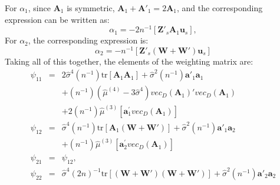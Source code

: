 \documentclass{article}
\begin{document}
For $\alpha_1$, since $\mathbf{A}_1$ is symmetric, $\mathbf{A}_1 + \mathbf{A'}_1 = 2 \mathbf{A}_1$, and the corresponding expression can be written as:
\begin{equation*}
\alpha_1 = - 2 n^{-1} [ \mathbf{Z'}_s \mathbf{A}_1 \mathbf{u}_s ],
\end{equation*}
 For $\alpha_2$, the corresponding expression is:
\begin{equation*}
 \alpha_2 = - n^{-1} [ \mathbf{Z'}_s (\mathbf{W} + \mathbf{W'} ) \mathbf{u}_s ]
\end{equation*}
Taking all of this together, the elements of the weighting matrix are:
\begin{eqnarray*}
 \psi_{11} &=& 2  \hat{\sigma}^4 (n^{-1}) \mbox{tr} [ \mathbf{A}_1\mathbf{A}_1 ]
              + \hat{\sigma}^2 (n^{-1}) \mathbf{a'}_1 \mathbf{a}_1 \\
            &&+ (n^{-1}) (\hat{\mu}^{(4)} - 3 \hat{\sigma}^4) vec_D(\mathbf{A}_1)'vec_D (\mathbf{A}_1) \\
            &&+ 2 (n^{-1}) \hat{\mu}^{(3)} [ \mathbf{a}_1^{'} vec_D(\mathbf{A}_1)] \\
  \psi_{12} &=& \hat{\sigma}^4 (n^{-1}) \mbox{tr} [  \mathbf{A}_1 (\mathbf{W} + \mathbf{W'} )  ]
          + \hat{\sigma}^2 (n^{-1}) \mathbf{a'}_1 \mathbf{a}_2\\
          && +  (n^{-1}) \hat{\mu}^{(3)} [ \mathbf{a}_2^{'} vec_D(\mathbf{A}_1)]\\
      \psi_{21} &=& \psi_{12},\\
   \psi_{22} &=& \hat{\sigma}^4 (2n)^{-1} \mbox{tr} [ (\mathbf{W} + \mathbf{W'}) 
   (\mathbf{W} + \mathbf{W'}) ]
   + \hat{\sigma}^2 (n^{-1}) \mathbf{a'}_2 \mathbf{a}_2
\end{eqnarray*}



\end{document}
